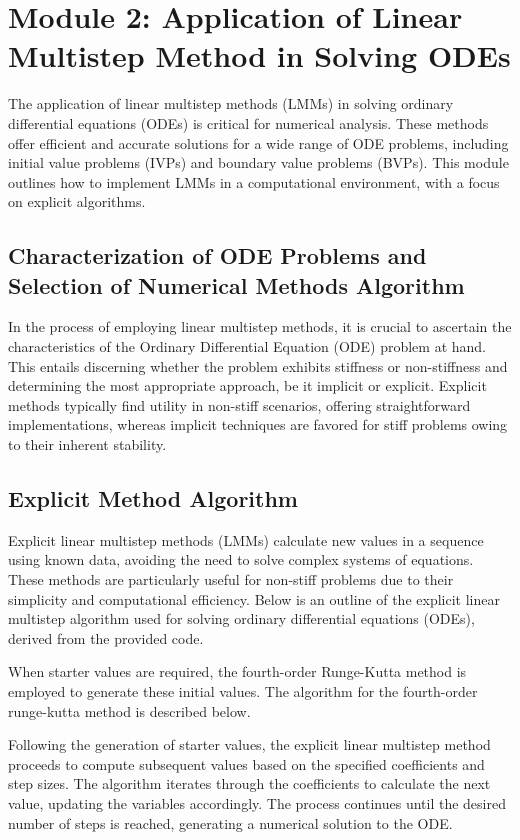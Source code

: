 \section{Module 2: Application of Linear Multistep Method in Solving ODEs}

The application of linear multistep methods (LMMs) in solving ordinary differential equations (ODEs) is critical for numerical analysis. These methods offer efficient and accurate solutions for a wide range of ODE problems, including initial value problems (IVPs) and boundary value problems (BVPs). This module outlines how to implement LMMs in a computational environment, with a focus on explicit algorithms.

\subsection*{Characterization of ODE Problems and Selection of Numerical Methods Algorithm}
In the process of employing linear multistep methods, it is crucial to ascertain the characteristics of the Ordinary Differential Equation (ODE) problem at hand. This entails discerning whether the problem exhibits stiffness or non-stiffness and determining the most appropriate approach, be it implicit or explicit. Explicit methods typically find utility in non-stiff scenarios, offering straightforward implementations, whereas implicit techniques are favored for stiff problems owing to their inherent stability.


\subsection{Explicit Method Algorithm}
Explicit linear multistep methods (LMMs) calculate new values in a sequence using known data, avoiding the need to solve complex systems of equations. These methods are particularly useful for non-stiff problems due to their simplicity and computational efficiency. Below is an outline of the explicit linear multistep algorithm used for solving ordinary differential equations (ODEs), derived from the provided code.

When starter values are required, the fourth-order Runge-Kutta method is employed to generate these initial values. The algorithm for the fourth-order runge-kutta method is described below.

Following the generation of starter values, the explicit linear multistep method proceeds to compute subsequent values based on the specified coefficients and step sizes. The algorithm iterates through the coefficients to calculate the next value, updating the variables accordingly. The process continues until the desired number of steps is reached, generating a numerical solution to the ODE.




